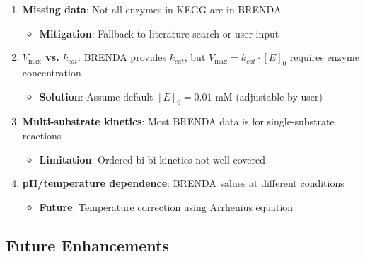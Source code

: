 \begin{enumerate}
    \item \textbf{Missing data}: Not all enzymes in KEGG are in BRENDA
    \begin{itemize}
        \item \textbf{Mitigation}: Fallback to literature search or user input
    \end{itemize}
    
    \item \textbf{$V_{\max}$ vs. $k_{cat}$}: BRENDA provides $k_{cat}$, but $V_{\max} = k_{cat} \cdot [E]_0$ requires enzyme concentration
    \begin{itemize}
        \item \textbf{Solution}: Assume default $[E]_0 = 0.01$ mM (adjustable by user)
    \end{itemize}
    
    \item \textbf{Multi-substrate kinetics}: Most BRENDA data is for single-substrate reactions
    \begin{itemize}
        \item \textbf{Limitation}: Ordered bi-bi kinetics not well-covered
    \end{itemize}
    
    \item \textbf{pH/temperature dependence}: BRENDA values at different conditions
    \begin{itemize}
        \item \textbf{Future}: Temperature correction using Arrhenius equation
    \end{itemize}
\end{enumerate}

\subsection{Future Enhancements}
\label{subsec:brenda-future-enhancements}


